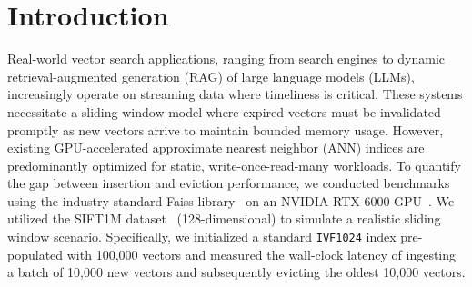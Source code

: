 \documentclass[sigconf,anonymous]{acmart}
\newcommand{\don}[1]{\textcolor{blue}{[Dongfang: #1]}}
\theoremstyle{plain}
\theoremstyle{definition}
\theoremstyle{remark}
\begin{document}
\section{Introduction}


Real-world vector search applications, ranging from search engines to dynamic retrieval-augmented generation (RAG) of large language models (LLMs), increasingly operate on streaming data where timeliness is critical. These systems necessitate a sliding window model where expired vectors must be invalidated promptly as new vectors arrive to maintain bounded memory usage. However, existing GPU-accelerated approximate nearest neighbor (ANN) indices are predominantly optimized for static, write-once-read-many workloads.
To quantify the gap between insertion and eviction performance, we conducted benchmarks using the industry-standard Faiss library~\cite{johnson2019billion} on an NVIDIA RTX 6000 GPU~\cite{keahey2020lessons}. We utilized the SIFT1M dataset~\cite{jegou2011product} (128-dimensional) to simulate a realistic sliding window scenario. Specifically, we initialized a standard \texttt{IVF1024} index pre-populated with 100,000 vectors and measured the wall-clock latency of ingesting a batch of 10,000 new vectors and subsequently evicting the oldest 10,000 vectors. 
\end{document}

